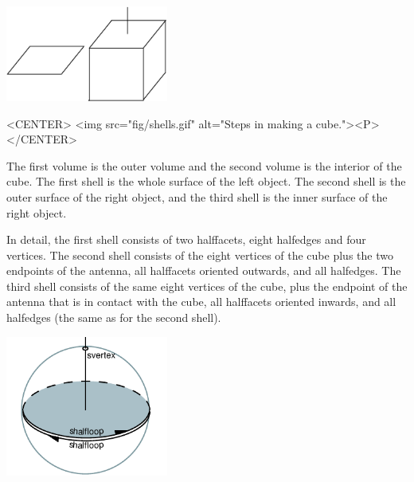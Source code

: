 \begin{ccTexOnly}
    \begin{center}
      \parbox{0.4\textwidth}{%
          \includegraphics[width=0.4\textwidth]{Nef_3/fig/shells}%
      }
    \end{center}
\end{ccTexOnly}

\begin{ccHtmlOnly}
    <CENTER>
        <img src="fig/shells.gif" alt="Steps in making a cube."><P>
    </CENTER>
\end{ccHtmlOnly}


The first volume is the outer volume and the second volume is the
interior of the cube. The first shell is the whole surface of the left
object. The second shell is the outer surface of the right object, and
the third shell is the inner surface of the right object. 

In detail, the first shell consists of two halffacets, eight halfedges
and four vertices. The second shell consists of the eight vertices of
the cube plus the two endpoints of the antenna, all halffacets
oriented outwards, and all halfedges. The third shell consists of the
same eight vertices of the cube, plus the endpoint of the antenna
that is in contact with the cube, all halffacets
oriented inwards, and all halfedges (the same as for the second shell).

\begin{ccTexOnly}
    \begin{center}
      \parbox{0.4\textwidth}{%
          \includegraphics[width=0.4\textwidth]{Nef_3/fig/closeup}%
      }
    \end{center}
\end{ccTexOnly}

